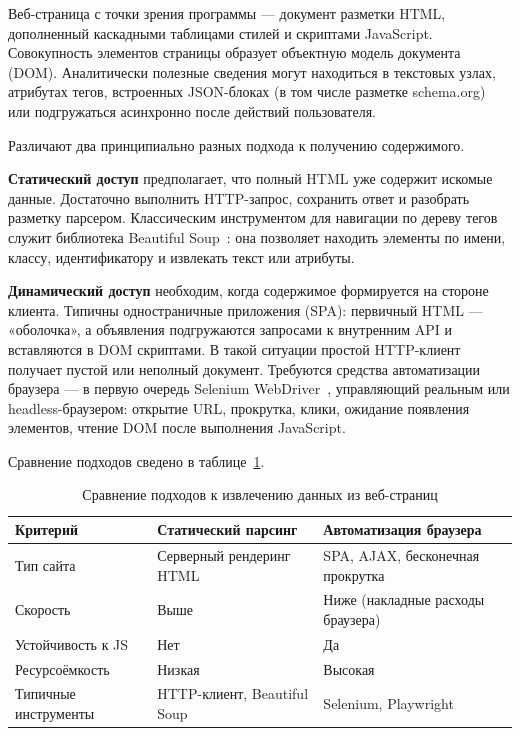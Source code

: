 Веб-страница с точки зрения программы --- документ разметки HTML, дополненный каскадными таблицами стилей и скриптами JavaScript. Совокупность элементов страницы образует объектную модель документа (DOM). Аналитически полезные сведения могут находиться в текстовых узлах, атрибутах тегов, встроенных JSON-блоках (в том числе разметке schema.org) или подгружаться асинхронно после действий пользователя.

Различают два принципиально разных подхода к получению содержимого.

\textbf{Статический доступ} предполагает, что полный HTML уже содержит искомые данные. Достаточно выполнить HTTP-запрос, сохранить ответ и разобрать разметку парсером. Классическим инструментом для навигации по дереву тегов служит библиотека Beautiful Soup~\cite{beautifulsoup}: она позволяет находить элементы по имени, классу, идентификатору и извлекать текст или атрибуты.

\textbf{Динамический доступ} необходим, когда содержимое формируется на стороне клиента. Типичны одностраничные приложения (SPA): первичный HTML --- «оболочка», а объявления подгружаются запросами к внутренним API и вставляются в DOM скриптами. В такой ситуации простой HTTP-клиент получает пустой или неполный документ. Требуются средства автоматизации браузера --- в первую очередь Selenium WebDriver~\cite{selenium}, управляющий реальным или headless-браузером: открытие URL, прокрутка, клики, ожидание появления элементов, чтение DOM после выполнения JavaScript.

Сравнение подходов сведено в таблице~\ref{tab:parse-methods}.

\begin{table}[htbp]
\centering
\begin{tabular}{|p{3.2cm}|p{4.8cm}|p{4.8cm}|}
\hline
\textbf{Критерий} & \textbf{Статический парсинг} & \textbf{Автоматизация браузера} \\
\hline
Тип сайта & Серверный рендеринг HTML & SPA, AJAX, бесконечная прокрутка \\
\hline
Скорость & Выше & Ниже (накладные расходы браузера) \\
\hline
Устойчивость к JS & Нет & Да \\
\hline
Ресурсоёмкость & Низкая & Высокая \\
\hline
Типичные инструменты & HTTP-клиент, Beautiful Soup & Selenium, Playwright~\cite{playwright} \\
\hline
\end{tabular}
\caption{Сравнение подходов к извлечению данных из веб-страниц}
\label{tab:parse-methods}
\end{table}

